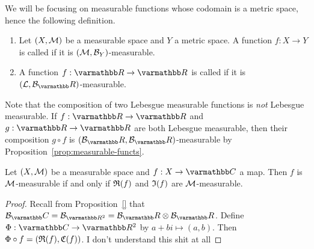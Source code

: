 We will be focusing on measurable functions whose codomain is a metric space, hence the following definition.

\begin{definition}
    \phantom{a}
    \begin{enumerate}[label = (\arabic*),itemsep=1pt,topsep=3pt]
        \item Let $(X,\mathcal{M})$ be a measurable space and $Y$ a metric space. A function $f:X \rightarrow Y$ is called  if it is $(\mathcal{M},\mathcal{B}_Y)$-measurable.
        \item A function $f:\bfR \rightarrow \bfR$ is called  if it is $(\cL,\cB_\bfR)$-measurable.
    \end{enumerate}
\end{definition}

\begin{remark}
    Note that the composition of two Lebesgue measurable functions is \textit{not} Lebesgue measurable. If $f:\bfR \rightarrow \bfR$ and $g:\bfR \rightarrow \bfR$ are both Lebesgue measurable, then their composition $g \circ f$ is $(\cB_\bfR,\cB_\bfR)$-measurable by Proposition~\ref{prop:measurable-functs}.
\end{remark}

\begin{proposition}
    Let $(X,\mathcal{M})$ be a measurable space and $f:X \rightarrow \bfC$ a map. Then $f$ is $\mathcal{M}$-measurable if and only if $\mathfrak{R}(f)$ and $\mathfrak{I}(f)$ are $\mathcal{M}$-measurable.
\end{proposition}
    \begin{proof}
        Recall from Proposition~\ref{} that $\cB_\bfC = \cB_{\bfR^2} = \cB_\bfR \otimes \cB_\bfR$. Define $\Phi:\bfC \rightarrow \bfR^2$ by $a+bi \mapsto (a,b)$. Then $\Phi \circ f = (\mathfrak{R}(f),\mathfrak{C}(f))$. {\color{red} I don't understand this shit at all}
    \end{proof}

